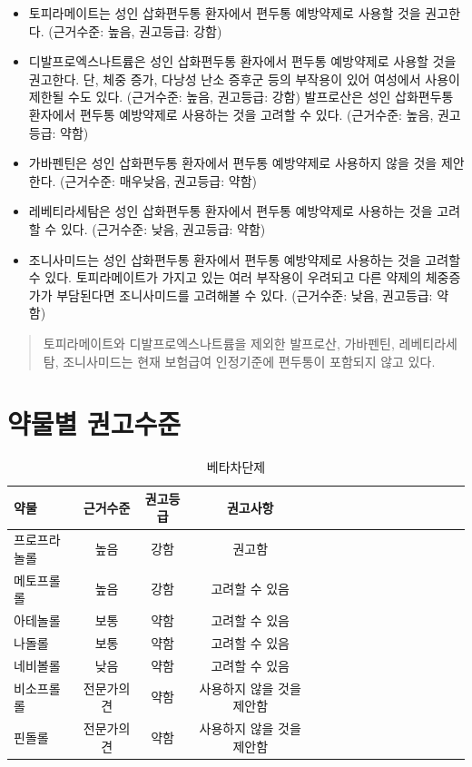 \documentclass[]{book}
\begin{document}
\begin{itemize}
\item
  토피라메이트는 성인 삽화편두통 환자에서 편두통 예방약제로 사용할 것을 권고한다. (근거수준: 높음, 권고등급: 강함)
\item
  디발프로엑스나트륨은 성인 삽화편두통 환자에서 편두통 예방약제로 사용할 것을 권고한다. 단, 체중 증가, 다낭성 난소 증후군 등의 부작용이 있어 여성에서 사용이 제한될 수도 있다. (근거수준: 높음, 권고등급: 강함) 발프로산은 성인 삽화편두통 환자에서 편두통 예방약제로 사용하는 것을 고려할 수 있다. (근거수준: 높음, 권고등급: 약함)
\item
  가바펜틴은 성인 삽화편두통 환자에서 편두통 예방약제로 사용하지 않을 것을 제안한다. (근거수준: 매우낮음, 권고등급: 약함)
\item
  레베티라세탐은 성인 삽화편두통 환자에서 편두통 예방약제로 사용하는 것을 고려할 수 있다. (근거수준: 낮음, 권고등급: 약함)
\item
  조니사미드는 성인 삽화편두통 환자에서 편두통 예방약제로 사용하는 것을 고려할 수 있다. 토피라메이트가 가지고 있는 여러 부작용이 우려되고 다른 약제의 체중증가가 부담된다면 조니사미드를 고려해볼 수 있다. (근거수준: 낮음, 권고등급: 약함)
\end{itemize}

\begin{quote}
토피라메이트와 디발프로엑스나트륨을 제외한 발프로산, 가바펜틴, 레베티라세탐, 조니사미드는 현재 보험급여 인정기준에 편두통이 포함되지 않고 있다.
\end{quote}

\hypertarget{section-5}{%
\section{약물별 권고수준}\label{section-5}}

\begin{longtable}{lccclccclccclccc}
\caption{\label{tab:unnamed-chunk-2}베타차단제}\\
\toprule
약물 & 근거수준 & 권고등급 & 권고사항\\
\midrule
프로프라놀롤 & 높음 & 강함 & 권고함\\
메토프롤롤 & 높음 & 강함 & 고려할 수 있음\\
아테놀롤 & 보통 & 약함 & 고려할 수 있음\\
나돌롤 & 보통 & 약함 & 고려할 수 있음\\
네비볼롤 & 낮음 & 약함 & 고려할 수 있음\\
\addlinespace
비소프롤롤 & 전문가의견 & 약함 & 사용하지 않을 것을 제안함\\
핀돌롤 & 전문가의견 & 약함 & 사용하지 않을 것을 제안함\\
\bottomrule
\end{longtable}
\end{document}
